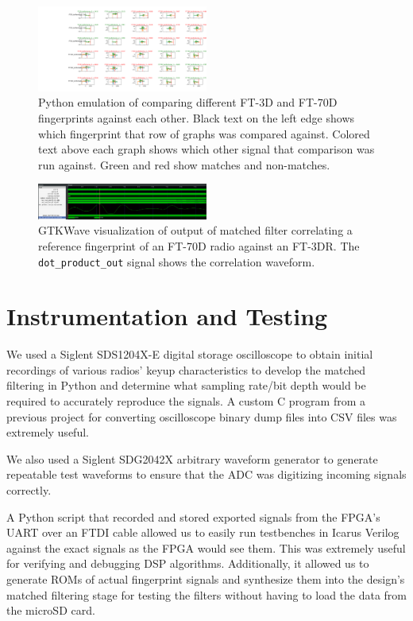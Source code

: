 \documentclass[conference]{IEEEtran}
\begin{document}
\begin{figure}
    \centerline{\includegraphics[width=0.5\textwidth]{Successful_Classifications.png}}
    \caption{Python emulation of comparing different FT-3D and FT-70D fingerprints against each other. Black text on the left edge shows which fingerprint that row of graphs was compared against. Colored text above each graph shows which other signal that comparison was run against. Green and red show matches and non-matches.}
    \label{python_matching}
\end{figure}

\begin{figure}
    \centerline{\includegraphics[width=0.5\textwidth]{FT70D_vs_FT3DR.png}}
    \caption{GTKWave visualization of output of matched filter correlating a reference fingerprint of an FT-70D radio against an FT-3DR. The \lstinline{dot_product_out} signal shows the correlation waveform.}
    \label{correlation}
\end{figure}

\section{Instrumentation and Testing}

We used a Siglent SDS1204X-E digital storage oscilloscope to obtain initial recordings of various radios' keyup characteristics to develop the matched filtering in Python and determine what sampling rate/bit depth would be required to accurately reproduce the signals. A custom C program from a previous project for converting oscilloscope binary dump files into CSV files was extremely useful.

We also used a Siglent SDG2042X arbitrary waveform generator to generate repeatable test waveforms to ensure that the ADC was digitizing incoming signals correctly.

A Python script that recorded and stored exported signals from the FPGA's UART over an FTDI cable allowed us to easily run testbenches in Icarus Verilog against the exact signals as the FPGA would see them. This was extremely useful for verifying and debugging DSP algorithms. Additionally, it allowed us to generate ROMs of actual fingerprint signals and synthesize them into the design's matched filtering stage for testing the filters without having to load the data from the microSD card.
\end{document}
